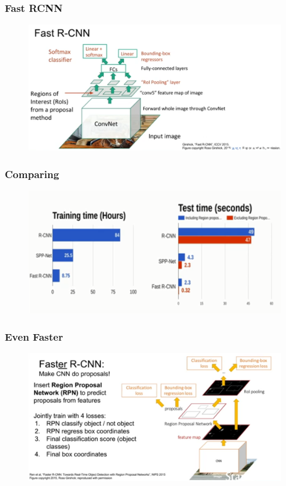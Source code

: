 \documentclass{beamer}
\begin{document}
\begin{frame}
	\frametitle{Fast RCNN}
	
	\begin{figure}
		\includegraphics[width=\linewidth]{Pics/fastrcnn.PNG}
		
	\end{figure}
	
\end{frame}
\begin{frame}
	\frametitle{Comparing}
	
	\begin{figure}
		\includegraphics[width=\linewidth]{Pics/crcnn.PNG}
		
	\end{figure}
	
\end{frame}
\begin{frame}
\frametitle{Even Faster}
\begin{figure}
	\includegraphics[width=\linewidth]{Pics/FasterRCNN.png}
\end{figure}
\end{frame}
\end{document}
